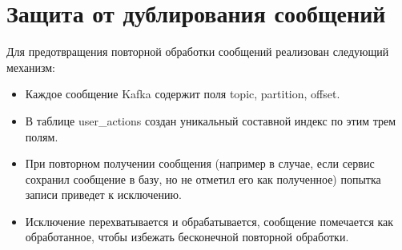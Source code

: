 \section{Защита от дублирования сообщений}

Для предотвращения повторной обработки сообщений реализован следующий механизм:
\begin{itemize}
	\item Каждое сообщение Kafka содержит поля topic, partition, offset.
	\item В таблице user\_actions создан уникальный составной индекс по этим трем полям.
	\item При повторном получении сообщения (например в случае, если сервис сохранил сообщение в базу, но не отметил его как полученное) попытка записи приведет к исключению.
	\item Исключение перехватывается и обрабатывается, сообщение помечается как обработанное, чтобы избежать бесконечной повторной обработки.
\end{itemize}
